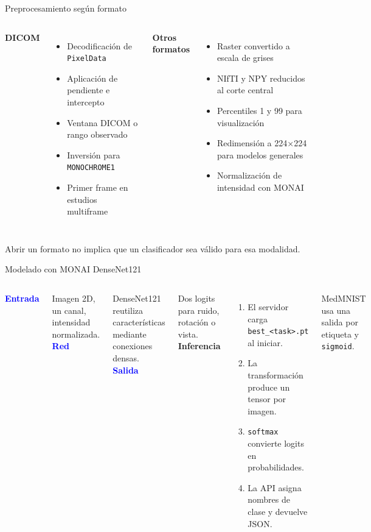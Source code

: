 \documentclass[aspectratio=169,10pt]{beamer}
\newcommand{\bigpoint}[2]{\textcolor{Blue}{\Large\bfseries #1}\par\smallskip #2}
\begin{document}
\begin{frame}{Preprocesamiento según formato}
\begin{columns}[T,onlytextwidth]
{\bfseries\color{Navy}DICOM}
\begin{itemize}
  \item Decodificación de \texttt{PixelData}
  \item Aplicación de pendiente e intercepto
  \item Ventana DICOM o rango observado
  \item Inversión para \texttt{MONOCHROME1}
  \item Primer frame en estudios multiframe
\end{itemize}
{\bfseries\color{Navy}Otros formatos}
\begin{itemize}
  \item Raster convertido a escala de grises
  \item NIfTI y NPY reducidos al corte central
  \item Percentiles 1 y 99 para visualización
  \item Redimensión a 224×224 para modelos generales
  \item Normalización de intensidad con MONAI
\end{itemize}
\end{columns}
\vspace{0.45cm}
\centering\color{Coral}\small Abrir un formato no implica que un clasificador sea válido para esa modalidad.
\end{frame}

\begin{frame}{Modelado con MONAI DenseNet121}
\begin{columns}[T,onlytextwidth]
\bigpoint{Entrada}{Imagen 2D, un canal, intensidad normalizada.}
\vspace{0.45cm}
\bigpoint{Red}{DenseNet121 reutiliza características mediante conexiones densas.}
\vspace{0.45cm}
\bigpoint{Salida}{Dos logits para ruido, rotación o vista.}
{\bfseries\color{Navy}Inferencia}
\begin{enumerate}
  \item El servidor carga \texttt{best\_<task>.pt} al iniciar.
  \item La transformación produce un tensor por imagen.
  \item \texttt{softmax} convierte logits en probabilidades.
  \item La API asigna nombres de clase y devuelve JSON.
\end{enumerate}
\vspace{0.35cm}
{\color{Muted}\small MedMNIST usa una salida por etiqueta y \texttt{sigmoid}.}
\end{columns}
\end{frame}
\end{document}

